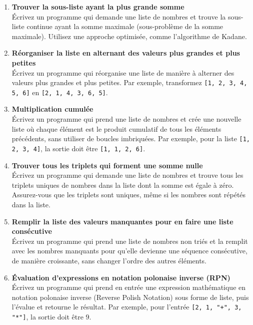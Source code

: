 
\begin{enumerate}

    \item \textbf{Trouver la sous-liste ayant la plus grande somme} \\
    Écrivez un programme qui demande une liste de nombres et trouve la sous-liste continue ayant la somme maximale (sous-problème de la somme maximale). Utilisez une approche optimisée, comme l’algorithme de Kadane.

    \item \textbf{Réorganiser la liste en alternant des valeurs plus grandes et plus petites} \\
    Écrivez un programme qui réorganise une liste de manière à alterner des valeurs plus grandes et plus petites. Par exemple, transformez \texttt{[1, 2, 3, 4, 5, 6]} en \texttt{[2, 1, 4, 3, 6, 5]}.

    \item \textbf{Multiplication cumulée} \\
    Écrivez un programme qui prend une liste de nombres et crée une nouvelle liste où chaque élément est le produit cumulatif de tous les éléments précédents, sans utiliser de boucles imbriquées. Par exemple, pour la liste \texttt{[1, 2, 3, 4]}, la sortie doit être \texttt{[1, 1, 2, 6]}.

    \item \textbf{Trouver tous les triplets qui forment une somme nulle} \\
    Écrivez un programme qui demande une liste de nombres et trouve tous les triplets uniques de nombres dans la liste dont la somme est égale à zéro. Assurez-vous que les triplets sont uniques, même si les nombres sont répétés dans la liste.

    \item \textbf{Remplir la liste des valeurs manquantes pour en faire une liste consécutive} \\
    Écrivez un programme qui prend une liste de nombres non triés et la remplit avec les nombres manquants pour qu’elle devienne une séquence consécutive, de manière croissante, sans changer l'ordre des autres éléments.

    \item \textbf{Évaluation d'expressions en notation polonaise inverse (RPN)} \\
    Écrivez un programme qui prend en entrée une expression mathématique en notation polonaise inverse (Reverse Polish Notation) sous forme de liste, puis l'évalue et retourne le résultat. Par exemple, pour l'entrée \texttt{[2, 1, "+", 3, "*"]}, la sortie doit être $9$.


\end{enumerate}
